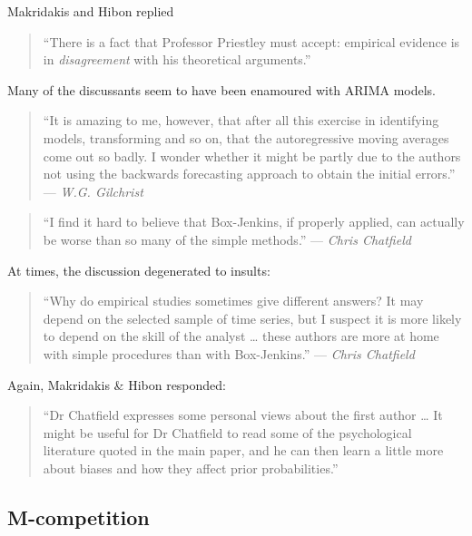 \documentclass[11pt,a4paper,]{article}
\begin{document}
Makridakis and Hibon replied

\begin{quote}
``There is a fact that Professor Priestley must accept: empirical evidence is in \emph{disagreement} with his theoretical arguments.''
\end{quote}

Many of the discussants seem to have been enamoured with ARIMA models.

\begin{quote}
``It is amazing to me, however, that after all this exercise in identifying models, transforming and so on, that the autoregressive moving averages come out so badly. I wonder whether it might be partly due to the authors not using the backwards forecasting approach to obtain the initial errors.'' --- \emph{W.G. Gilchrist}
\end{quote}

\begin{quote}
``I find it hard to believe that Box-Jenkins, if properly applied, can actually be worse than so many of the simple methods.'' --- \emph{Chris Chatfield}
\end{quote}

At times, the discussion degenerated to insults:

\begin{quote}
``Why do empirical studies sometimes give different answers? It may depend on the selected sample of time series, but I suspect it is more likely to depend on the skill of the analyst \ldots{} these authors are more at home with simple procedures than with Box-Jenkins.'' --- \emph{Chris Chatfield}
\end{quote}

Again, Makridakis \& Hibon responded:

\begin{quote}
``Dr Chatfield expresses some personal views about the first author \ldots{} It might be useful for Dr Chatfield to read some of the psychological literature quoted in the main paper, and he can then learn a little more about biases and how they affect prior probabilities.''
\end{quote}

\hypertarget{m-competition}{%
\subsection*{M-competition}\label{m-competition}}
\end{document}
